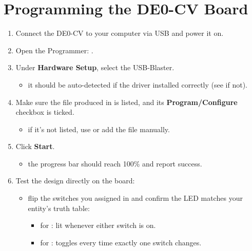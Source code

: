 \section{Programming the DE0-CV Board}
\label{q:7}
\begin{enumerate}
  \item Connect the DE0-CV to your computer via USB and power it on.
  \item Open the Programmer: .
  \item Under \textbf{Hardware Setup}, select the USB-Blaster.
  \begin{itemize}
    \item it should be auto-detected if the driver installed correctly (see  if not).
  \end{itemize}
  \item Make sure the  file produced in  is listed, and its
    \textbf{Program/Configure} checkbox is ticked.
  \begin{itemize}
    \item if it's not listed, use  or add the file manually.
  \end{itemize}
  \item Click \textbf{Start}.
  \begin{itemize}
    \item the progress bar should reach 100\% and report success.
  \end{itemize}
  \item Test the design directly on the board:
  \begin{itemize}
    \item flip the switches you assigned in  and confirm the LED matches your entity's
      truth table:
    \begin{itemize}
      \item for : lit whenever either switch is on.
      \item for : toggles every time exactly one switch changes.
    \end{itemize}
  \end{itemize}
\end{enumerate}

